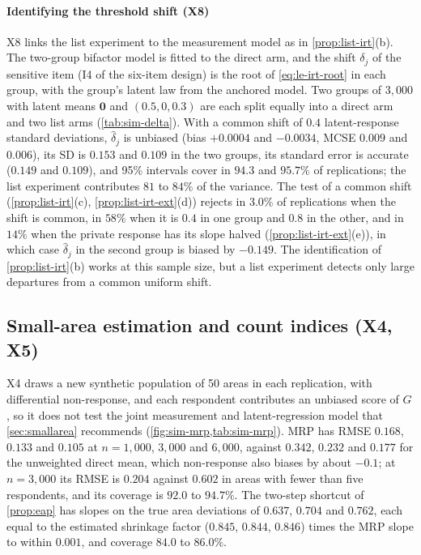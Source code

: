 \paragraph{Identifying the threshold shift (X8)}
X8 links the list experiment to the measurement model as in \cref{prop:list-irt}(b). The two-group bifactor model is fitted to the direct arm, and the shift $\delta_j$ of the sensitive item (I4 of the six-item design) is the root of \eqref{eq:le-irt-root} in each group, with the group's latent law from the anchored model. Two groups of $3{,}000$ with latent means $\bm0$ and $(0.5,0,0.3)$ are each split equally into a direct arm and two list arms (\cref{tab:sim-delta}). With a common shift of $0.4$ latent-response standard deviations, $\hat\delta_j$ is unbiased (bias $+0.0004$ and $-0.0034$, MCSE $0.009$ and $0.006$), its SD is $0.153$ and $0.109$ in the two groups, its standard error is accurate ($0.149$ and $0.109$), and 95\% intervals cover in $94.3$ and $95.7\%$ of replications; the list experiment contributes $81$ to $84\%$ of the variance. The test of a common shift (\cref{prop:list-irt}(c), \cref{prop:list-irt-ext}(d)) rejects in $3.0\%$ of replications when the shift is common, in $58\%$ when it is $0.4$ in one group and $0.8$ in the other, and in $14\%$ when the private response has its slope halved (\cref{prop:list-irt-ext}(e)), in which case $\hat\delta_j$ in the second group is biased by $-0.149$. The identification of \cref{prop:list-irt}(b) works at this sample size, but a list experiment detects only large departures from a common uniform shift.

\subsection{Small-area estimation and count indices (X4, X5)}\label{sec:sim-mrp}

X4 draws a new synthetic population of 50 areas in each replication, with differential non-response, and each respondent contributes an unbiased score of $G$, so it does not test the joint measurement and latent-regression model that \cref{sec:smallarea} recommends (\cref{fig:sim-mrp,tab:sim-mrp}). MRP has RMSE $0.168$, $0.133$ and $0.105$ at $n=1{,}000$, $3{,}000$ and $6{,}000$, against $0.342$, $0.232$ and $0.177$ for the unweighted direct mean, which non-response also biases by about $-0.1$; at $n=3{,}000$ its RMSE is $0.204$ against $0.602$ in areas with fewer than five respondents, and its coverage is $92.0$ to $94.7\%$. The two-step shortcut of \cref{prop:eap} has slopes on the true area deviations of $0.637$, $0.704$ and $0.762$, each equal to the estimated shrinkage factor ($0.845$, $0.844$, $0.846$) times the MRP slope to within $0.001$, and coverage $84.0$ to $86.0\%$.

